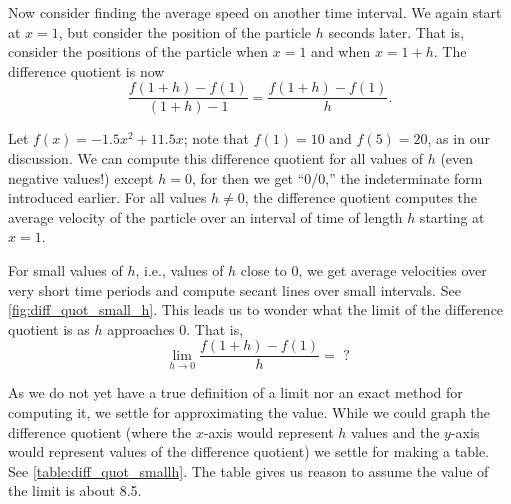 Now consider finding the average speed on another time interval. We again start at $x=1$, but consider the position of the particle $h$ seconds later. That is, consider the positions of the particle when $x=1$ and when $x=1+h$. The difference quotient is now $$\frac{f(1+h)-f(1)}{(1+h)-1} = \frac{f(1+h)-f(1)}h.$$

Let $f(x) = -1.5x^2+11.5x$; note that $f(1)=10$ and $f(5) = 20$, as in our discussion. We can compute this difference quotient for all values of $h$ (even negative values!) except $h=0$, for then we get ``0/0,'' the indeterminate form introduced earlier. For all values $h\neq 0$, the difference quotient computes the average velocity of the particle over an interval of time of length $h$ starting at $x=1$. 

For small values of $h$, i.e., values of $h$ close to 0, we get average velocities over very short time periods and compute secant lines over small intervals. See \autoref{fig:diff_quot_small_h}. This leads us to wonder what the limit of the difference quotient is as $h$ approaches 0. That is,
\[\lim_{h\to 0} \frac{f(1+h)-f(1)}{h} = \text{ ? }\]

As we do not yet have a true definition of a limit nor an exact method for computing it, we settle for approximating the value. While we could graph the difference quotient (where the $x$-axis would represent $h$ values and the $y$-axis would represent values of the difference quotient) we settle for making a table. See \autoref{table:diff_quot_smallh}. The table gives us reason to assume the value of the limit is about 8.5. \bigskip


%
%

